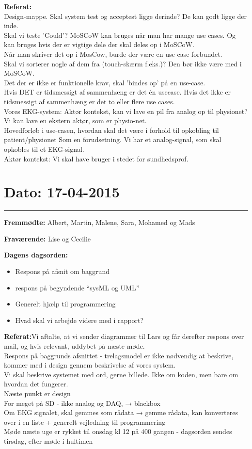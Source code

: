 \textbf{Referat: }\\ 
Design-mappe. Skal system test og acceptest ligge derinde?
De kan godt ligge der inde. \\
Skal vi teste ’Could’? 
MoSCoW kan bruges når man har mange use cases. Og kan bruges hvis der er vigtige dele der skal deles op i MoSCoW.
\\
Når man skriver det op i MosCow, burde der være en use case forbundet. 
\\
Skal vi sorterer nogle af dem fra (touch-skærm f.eks.)?
Den bør ikke være med i MoSCoW.
\\
Det der er ikke er funktionelle krav, skal ’bindes op’ på en use-case.
\\
Hvis DET er tidsmessigt af sammenhæng er det én usecase.
Hvis det ikke er tidsmessigt af sammenhæng er det to eller flere use cases.
\\
Vores EKG-system:
Aktør kontekst, kan vi lave en pil fra analog op til physionet?
Vi kan lave en ekstern aktør, som er physio-net.
\\
Hovedforløb i use-casen, hvordan skal det være i forhold til opkobling til patient/physionet
Som en forudsetning. 
Vi har et analog-signal, som skal opkobles til et EKG-signal.
\\
Aktør kontekst:
Vi skal have bruger i stedet for sundhedsprof.

\section{Dato: 17-04-2015}
\hrule

\textbf{Fremmødte:} Albert, Martin, Malene, Sara, Mohamed og Mads

\textbf{Fraværende:} Lise og Cecilie

\textbf{Dagens dagsorden:}
\begin{itemize}
	\item Respons på afsnit om baggrund
	\item respons på begyndende “sysML og UML”
	\item Generelt hjælp til programmering
	\item Hvad skal vi arbejde videre med i rapport?
\end{itemize}

\textbf{Referat:}Vi aftalte, at vi sender diagrammer til Lars og får derefter respons over mail, og hvis relevant, uddybet på næste møde. \\
	Respons på baggrunds afsnittet - trelagsmodel er ikke nødvendig at beskrive, kommer med i design gennem beskrivelse af vores system. \\
	Vi skal beskrive systemet med ord, gerne billede. Ikke om koden, men bare om hvordan det fungerer.\\
	Næste punkt er design \\
	For meget på SD - ikke analog og DAQ,  → blackbox\\
	Om EKG signalet, skal gemmes som rådata → gemme rådata, kan konverteres over i en liste + generelt vejledning til programmering \\
	Møde næste uge er rykket til onsdag kl 12 på 400 gangen - dagsorden sendes tirsdag, efter 	møde i hultimen

